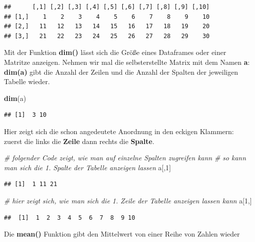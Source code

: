 \documentclass[]{book}
\newenvironment{Shaded}{\begin{snugshade}}{\end{snugshade}}
\newcommand{\KeywordTok}[1]{\textcolor[rgb]{0.13,0.29,0.53}{\textbf{#1}}}
\newcommand{\DecValTok}[1]{\textcolor[rgb]{0.00,0.00,0.81}{#1}}
\newcommand{\CommentTok}[1]{\textcolor[rgb]{0.56,0.35,0.01}{\textit{#1}}}
\newcommand{\NormalTok}[1]{#1}
\begin{document}
\begin{verbatim}
##      [,1] [,2] [,3] [,4] [,5] [,6] [,7] [,8] [,9] [,10]
## [1,]    1    2    3    4    5    6    7    8    9    10
## [2,]   11   12   13   14   15   16   17   18   19    20
## [3,]   21   22   23   24   25   26   27   28   29    30
\end{verbatim}

Mit der Funktion \textbf{dim()} lässt sich die Größe eines Dataframes
oder einer Matritze anzeigen. Nehmen wir mal die selbsterstellte Matrix
mit dem Namen \textbf{a}: \textbf{dim(a)} gibt die Anzahl der Zeilen und
die Anzahl der Spalten der jeweiligen Tabelle wieder.

\begin{Shaded}
\begin{Highlighting}[]
\KeywordTok{dim}\NormalTok{(a)}
\end{Highlighting}
\end{Shaded}

\begin{verbatim}
## [1]  3 10
\end{verbatim}

Hier zeigt sich die schon angedeutete Anordnung in den eckigen Klammern:
zuerst die links die \textbf{Zeile} dann rechts die \textbf{Spalte}.

\begin{Shaded}
\begin{Highlighting}[]
\CommentTok{# folgender Code zeigt, wie man auf einzelne Spalten zugreifen kann}
\CommentTok{# so kann man sich die 1. Spalte der Tabelle anzeigen lassen}
\NormalTok{a[,}\DecValTok{1}\NormalTok{]}
\end{Highlighting}
\end{Shaded}

\begin{verbatim}
## [1]  1 11 21
\end{verbatim}

\begin{Shaded}
\begin{Highlighting}[]
\CommentTok{# hier zeigt sich, wie man sich die 1. Zeile der Tabelle anzeigen lassen kann}
\NormalTok{a[}\DecValTok{1}\NormalTok{,]}
\end{Highlighting}
\end{Shaded}

\begin{verbatim}
##  [1]  1  2  3  4  5  6  7  8  9 10
\end{verbatim}

Die \textbf{mean()} Funktion gibt den Mittelwert von einer Reihe von
Zahlen wieder
\end{document}
